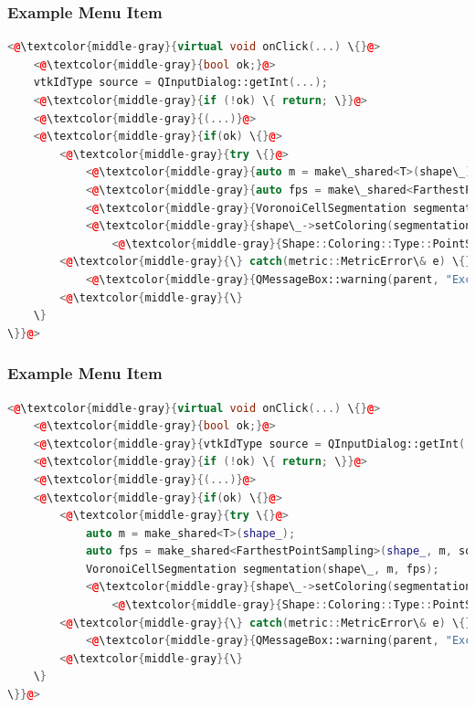 \documentclass[compress]{beamer}
\begin{document}
\begin{frame}[fragile]
  \frametitle{Example Menu Item}
  
\begin{lstlisting}[language=C++, keywordstyle=\color{blue},
                stringstyle=\color{red},
                commentstyle=\color{green}, numbers=none]
<@\textcolor{middle-gray}{virtual void onClick(...) \{}@>
    <@\textcolor{middle-gray}{bool ok;}@>
    vtkIdType source = QInputDialog::getInt(...);
    <@\textcolor{middle-gray}{if (!ok) \{ return; \}}@>
    <@\textcolor{middle-gray}{(...)}@>
    <@\textcolor{middle-gray}{if(ok) \{}@>
        <@\textcolor{middle-gray}{try \{}@>
            <@\textcolor{middle-gray}{auto m = make\_shared<T>(shape\_);}@>
            <@\textcolor{middle-gray}{auto fps = make\_shared<FarthestPointSampling>(shape\_, m, source, numberOfSegments);}@>
            <@\textcolor{middle-gray}{VoronoiCellSegmentation segmentation(shape\_, m, fps);}@>
            <@\textcolor{middle-gray}{shape\_->setColoring(segmentation.getSegments(), }@>
            	<@\textcolor{middle-gray}{Shape::Coloring::Type::PointSegmentation);}@>
        <@\textcolor{middle-gray}{\} catch(metric::MetricError\& e) \{}@>
            <@\textcolor{middle-gray}{QMessageBox::warning(parent, "Exception", e.what());}@>
        <@\textcolor{middle-gray}{\}
    \}
\}}@>
\end{lstlisting}
  
\end{frame}

\begin{frame}[fragile]
  \frametitle{Example Menu Item}
  
\begin{lstlisting}[language=C++, keywordstyle=\color{blue},
                stringstyle=\color{red},
                commentstyle=\color{green}, numbers=none]
<@\textcolor{middle-gray}{virtual void onClick(...) \{}@>
    <@\textcolor{middle-gray}{bool ok;}@>
    <@\textcolor{middle-gray}{vtkIdType source = QInputDialog::getInt(...);}@>
    <@\textcolor{middle-gray}{if (!ok) \{ return; \}}@>
    <@\textcolor{middle-gray}{(...)}@>
    <@\textcolor{middle-gray}{if(ok) \{}@>
        <@\textcolor{middle-gray}{try \{}@>
            auto m = make_shared<T>(shape_);
            auto fps = make_shared<FarthestPointSampling>(shape_, m, source, numberOfSegments);
            VoronoiCellSegmentation segmentation(shape\_, m, fps);
            <@\textcolor{middle-gray}{shape\_->setColoring(segmentation.getSegments(), }@>
            	<@\textcolor{middle-gray}{Shape::Coloring::Type::PointSegmentation);}@>
        <@\textcolor{middle-gray}{\} catch(metric::MetricError\& e) \{}@>
            <@\textcolor{middle-gray}{QMessageBox::warning(parent, "Exception", e.what());}@>
        <@\textcolor{middle-gray}{\}
    \}
\}}@>
\end{lstlisting}
  
\end{frame}
\end{document}
